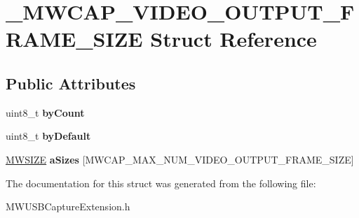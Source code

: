 \hypertarget{struct__MWCAP__VIDEO__OUTPUT__FRAME__SIZE}{\section{\-\_\-\-M\-W\-C\-A\-P\-\_\-\-V\-I\-D\-E\-O\-\_\-\-O\-U\-T\-P\-U\-T\-\_\-\-F\-R\-A\-M\-E\-\_\-\-S\-I\-Z\-E Struct Reference}
\label{struct__MWCAP__VIDEO__OUTPUT__FRAME__SIZE}
}
\subsection*{Public Attributes}
\begin{DoxyCompactItemize}
\item 
\hypertarget{struct__MWCAP__VIDEO__OUTPUT__FRAME__SIZE_abaaefb07e95b48fd5d6f49c0a48be940}{uint8\-\_\-t {\bfseries by\-Count}}\label{struct__MWCAP__VIDEO__OUTPUT__FRAME__SIZE_abaaefb07e95b48fd5d6f49c0a48be940}

\item 
\hypertarget{struct__MWCAP__VIDEO__OUTPUT__FRAME__SIZE_ad7fafa57448c3db99680adf11e17a745}{uint8\-\_\-t {\bfseries by\-Default}}\label{struct__MWCAP__VIDEO__OUTPUT__FRAME__SIZE_ad7fafa57448c3db99680adf11e17a745}

\item 
\hypertarget{struct__MWCAP__VIDEO__OUTPUT__FRAME__SIZE_a781b400ee2ec00e73c073e3d84b7f8df}{\hyperlink{struct__MWSIZE}{M\-W\-S\-I\-Z\-E} {\bfseries a\-Sizes} \mbox{[}M\-W\-C\-A\-P\-\_\-\-M\-A\-X\-\_\-\-N\-U\-M\-\_\-\-V\-I\-D\-E\-O\-\_\-\-O\-U\-T\-P\-U\-T\-\_\-\-F\-R\-A\-M\-E\-\_\-\-S\-I\-Z\-E\mbox{]}}\label{struct__MWCAP__VIDEO__OUTPUT__FRAME__SIZE_a781b400ee2ec00e73c073e3d84b7f8df}

\end{DoxyCompactItemize}


The documentation for this struct was generated from the following file\-:\begin{DoxyCompactItemize}
\item 
M\-W\-U\-S\-B\-Capture\-Extension.\-h\end{DoxyCompactItemize}
